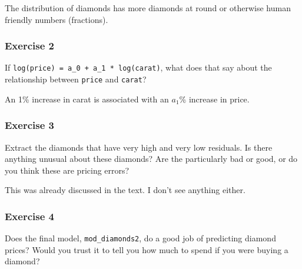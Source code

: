\documentclass[]{book}
\newenvironment{Shaded}{\begin{snugshade}}{\end{snugshade}}
\newcommand{\CommentTok}[1]{\textcolor[rgb]{0.56,0.35,0.01}{\textit{#1}}}
\newcommand{\DataTypeTok}[1]{\textcolor[rgb]{0.13,0.29,0.53}{#1}}
\newcommand{\DecValTok}[1]{\textcolor[rgb]{0.00,0.00,0.81}{#1}}
\newcommand{\FloatTok}[1]{\textcolor[rgb]{0.00,0.00,0.81}{#1}}
\newcommand{\KeywordTok}[1]{\textcolor[rgb]{0.13,0.29,0.53}{\textbf{#1}}}
\newcommand{\NormalTok}[1]{#1}
\newcommand{\OperatorTok}[1]{\textcolor[rgb]{0.81,0.36,0.00}{\textbf{#1}}}
\newcommand{\StringTok}[1]{\textcolor[rgb]{0.31,0.60,0.02}{#1}}
\theoremstyle{plain}
\theoremstyle{remark}
\theoremstyle{definition}
\theoremstyle{definition}
\theoremstyle{definition}
\theoremstyle{remark}
\begin{document}
The distribution of diamonds has more diamonds at round or otherwise
human friendly numbers (fractions).

\hypertarget{exercise-2-63}{%
\subsubsection{Exercise 2}\label{exercise-2-63}}

If \texttt{log(price)\ =\ a\_0\ +\ a\_1\ *\ log(carat)}, what does that
say about the relationship between \texttt{price} and \texttt{carat}?

An 1\% increase in carat is associated with an \(a_1\)\% increase in
price.

\hypertarget{exercise-3-51}{%
\subsubsection{Exercise 3}\label{exercise-3-51}}

Extract the diamonds that have very high and very low residuals. Is
there anything unusual about these diamonds? Are the particularly bad or
good, or do you think these are pricing errors?

This was already discussed in the text. I don't see anything either.

\hypertarget{exercise-4-37}{%
\subsubsection{Exercise 4}\label{exercise-4-37}}

Does the final model, \texttt{mod\_diamonds2}, do a good job of
predicting diamond prices? Would you trust it to tell you how much to
spend if you were buying a diamond?

\begin{Shaded}
\end{Shaded}
\end{document}
